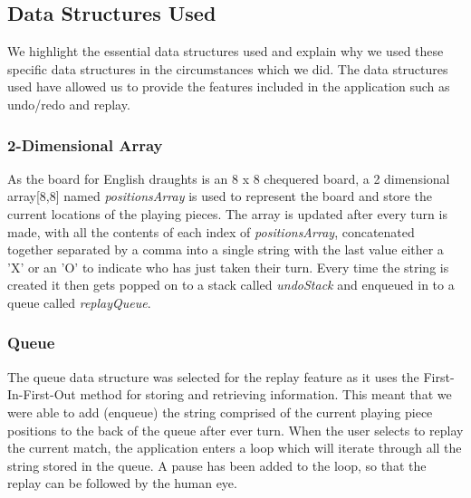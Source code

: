 \documentclass[10pt, a4paper]{article}
\begin{document}
    \subsection{Data Structures Used}
    We highlight the essential data structures used and 
    \newline
    explain why we used these specific data structures in the circumstances which we did. The data structures used have allowed us to provide the features included in the application such as undo/redo and replay.  
     
    
    \subsubsection{2-Dimensional Array}   
    As the board for English draughts is an 8 x 8 chequered board, a 2 dimensional array[8,8] named \textit{positionsArray} is used to represent the board and store the current 
    \newline 
    locations of the playing pieces. The array is updated 
    \newline
    after every turn is made, with all the contents of each 
    \newline
    index of \textit{positionsArray}, concatenated together separated by a comma into a single string with the last value either a 'X' or an 'O' to indicate who has just taken their turn. Every time the string is created it then gets popped on to a stack called \textit{undoStack} and enqueued in to a queue called \textit{replayQueue}. 
    
    \subsubsection{Queue}
    The queue data structure was selected for the replay 
    \newline
    feature as it uses the First-In-First-Out method for 
    \newline
    storing and retrieving information. This meant that we were able to add (enqueue) the string comprised of the current playing piece positions to the back of the queue after ever turn. When the user selects to replay the 
    \newline
    current match, the application enters a loop which will 
    \newline
    iterate through all the string stored in the queue. A pause has been added to the loop, so that the replay can be followed by the human eye.
    
\end{document}

